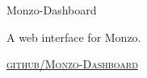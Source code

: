 {
  {\raggedright\large {
    Monzo-Dashboard
  } \\}

  A web interface for Monzo.

  \textsc{\small\href{http://github.com/LukeSheard/Monzo-Dashboard}{github/Monzo-Dashboard}}
} \\
